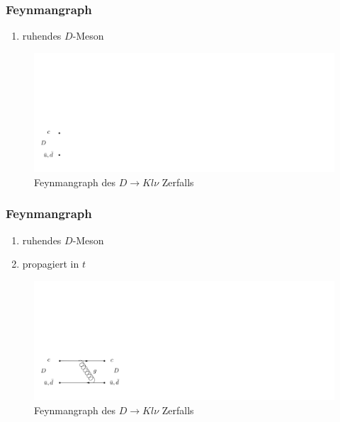 \documentclass[hyperref={pdfpagelabels=false}]{beamer}
\begin{document}
 \begin{frame}
  \frametitle{Feynmangraph}
   \setcounter{framenumber}{4}
 \begin{minipage}[h]{0.38\textwidth}
  \begin{enumerate}
   \item ruhendes $D$-Meson
 \end{enumerate}
 \end{minipage}
 \begin{minipage}[h]{0.58\textwidth}
   \begin{figure}[h]
   \includegraphics[width = 1.9\textwidth]{../Abbildungen/DFeyn1.png}
    \caption{Feynmangraph des $D\rightarrow Kl\nu$ Zerfalls}
  \end{figure}
 \end{minipage}
 \end{frame}
 
 \begin{frame}
  \frametitle{Feynmangraph}
 \setcounter{framenumber}{4}
 \begin{minipage}[h]{0.38\textwidth}
  \begin{enumerate}
   \item ruhendes $D$-Meson
   \item propagiert in $t$
  \end{enumerate}
 \end{minipage}
 \begin{minipage}[h]{0.58\textwidth}
   \begin{figure}[h]
   \includegraphics[width = 1.9\textwidth]{../Abbildungen/DFeyn2.png}
    \caption{Feynmangraph des $D\rightarrow Kl\nu$ Zerfalls}
  \end{figure}
 \end{minipage}
 \end{frame}
 
\end{document}
